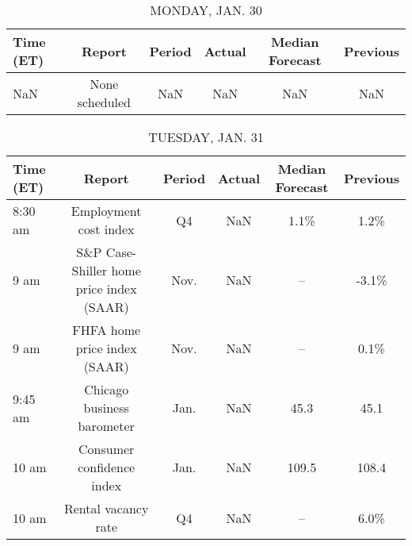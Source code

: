 \documentclass{article}%
\begin{document}
%
\normalsize%


\begin{table}[htbp]%
\caption{MONDAY, JAN. 30}%
\centering%
\begin{adjustbox}{width=1\textwidth}%
\begin{tabular}{lccccc}
\toprule
Time (ET) &         Report & Period & Actual & Median Forecast & Previous \\
\midrule
      NaN & None scheduled &    NaN &    NaN &             NaN &      NaN \\
\bottomrule
\end{tabular}
%
\end{adjustbox}%
\end{table}

%


\begin{table}[htbp]%
\caption{TUESDAY, JAN. 31}%
\centering%
\begin{adjustbox}{width=1\textwidth}%
\begin{tabular}{lccccc}
\toprule
Time (ET) &                                   Report & Period & Actual & Median Forecast & Previous \\
\midrule
  8:30 am &                    Employment cost index &     Q4 &    NaN &            1.1\% &     1.2\% \\
     9 am & S\&P Case-Shiller home price index (SAAR) &   Nov. &    NaN &              -- &    -3.1\% \\
     9 am &             FHFA home price index (SAAR) &   Nov. &    NaN &              -- &     0.1\% \\
  9:45 am &               Chicago business barometer &   Jan. &    NaN &            45.3 &     45.1 \\
    10 am &                Consumer confidence index &   Jan. &    NaN &           109.5 &    108.4 \\
    10 am &                      Rental vacancy rate &     Q4 &    NaN &              -- &     6.0\% \\
\bottomrule
\end{tabular}
%
\end{adjustbox}%
\end{table}

%
\end{document}
